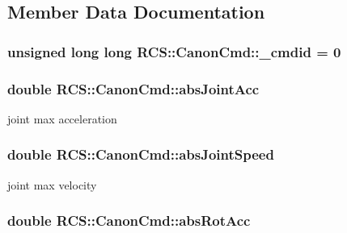 \subsection{Member Data Documentation}
\hypertarget{structRCS_1_1CanonCmd_ae719b5ae5d58e75b652b27df76113010}{
\subsubsection[{\-\_\-cmdid}]{\setlength{\rightskip}{0pt plus 5cm}unsigned long long R\-C\-S\-::\-Canon\-Cmd\-::\-\_\-cmdid = 0\hspace{0.3cm}{\ttfamily [static]}}}\label{structRCS_1_1CanonCmd_ae719b5ae5d58e75b652b27df76113010}
\hypertarget{structRCS_1_1CanonCmd_ac31a9f71e4cbf531255df37780deed05}{
\subsubsection[{abs\-Joint\-Acc}]{\setlength{\rightskip}{0pt plus 5cm}double R\-C\-S\-::\-Canon\-Cmd\-::abs\-Joint\-Acc}}\label{structRCS_1_1CanonCmd_ac31a9f71e4cbf531255df37780deed05}
joint max acceleration \hypertarget{structRCS_1_1CanonCmd_a0af201b279565849516543a913f443f7}{
\subsubsection[{abs\-Joint\-Speed}]{\setlength{\rightskip}{0pt plus 5cm}double R\-C\-S\-::\-Canon\-Cmd\-::abs\-Joint\-Speed}}\label{structRCS_1_1CanonCmd_a0af201b279565849516543a913f443f7}
joint max velocity \hypertarget{structRCS_1_1CanonCmd_ae1abe3a2d6c4c54776ad46738b3bf571}{
\subsubsection[{abs\-Rot\-Acc}]{\setlength{\rightskip}{0pt plus 5cm}double R\-C\-S\-::\-Canon\-Cmd\-::abs\-Rot\-Acc}}\label{structRCS_1_1CanonCmd_ae1abe3a2d6c4c54776ad46738b3bf571}
